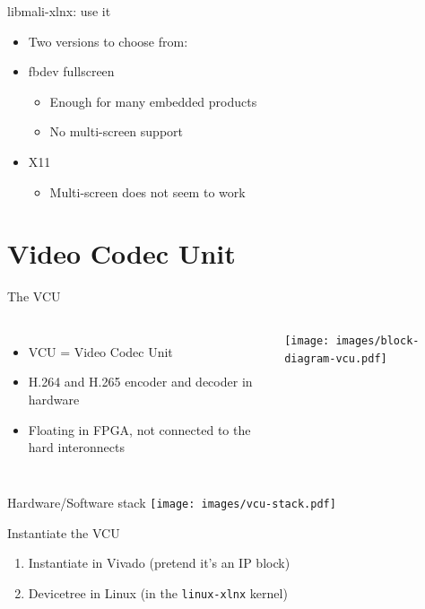 \documentclass[xetex,table]{beamer}
\begin{document}
\begin{frame}{libmali-xlnx: use it}
   \begin{itemize}
  \item Two versions to choose from:
  \item fbdev fullscreen
    \begin{itemize}
    \item Enough for many embedded products
    \item No multi-screen support
    \end{itemize}
  \item X11
    \begin{itemize}
    \item Multi-screen does not seem to work
    \end{itemize}
  \end{itemize}
\end{frame}

\section{Video Codec Unit}

\begin{frame}{The VCU}
  \begin{columns}
    \begin{itemize}
    \item VCU = Video Codec Unit
    \item H.264 and H.265 encoder and decoder in hardware
    \item Floating in FPGA, not connected to the hard interonnects
    \end{itemize}
    \texttt{[image: images/block-diagram-vcu.pdf]}
  \end{columns}
\end{frame}

\begin{frame}{Hardware/Software stack}
  \center\texttt{[image: images/vcu-stack.pdf]}
\end{frame}

\begin{frame}{Instantiate the VCU}
  \begin{enumerate}
  \item Instantiate in Vivado (pretend it's an IP block)
  \item Devicetree in Linux (in the {\tt linux-xlnx} kernel)
  \end{enumerate}
\end{frame}
\end{document}
